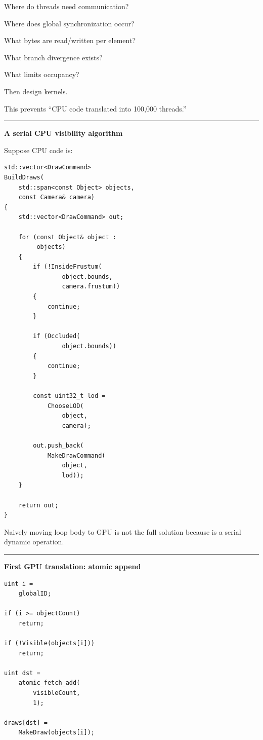 Where do threads need communication?

Where does global synchronization occur?

What bytes are read/written per element?

What branch divergence exists?

What limits occupancy?

Then design kernels.

This prevents ``CPU code translated into 100,000 threads.''

\begin{center}\rule{0.5\linewidth}{0.5pt}\end{center}

\textbf{A serial CPU visibility algorithm}

Suppose CPU code is:

\protect{}\label{p10-serial-cull}%
\begin{verbatim}
std::vector<DrawCommand>
BuildDraws(
    std::span<const Object> objects,
    const Camera& camera)
{
    std::vector<DrawCommand> out;

    for (const Object& object :
         objects)
    {
        if (!InsideFrustum(
                object.bounds,
                camera.frustum))
        {
            continue;
        }

        if (Occluded(
                object.bounds))
        {
            continue;
        }

        const uint32_t lod =
            ChooseLOD(
                object,
                camera);

        out.push_back(
            MakeDrawCommand(
                object,
                lod));
    }

    return out;
}
\end{verbatim}

Naively moving loop body to GPU is not the full solution because  is a serial dynamic operation.

\begin{center}\rule{0.5\linewidth}{0.5pt}\end{center}

\textbf{First GPU translation: atomic append}

\protect{}\label{p10-atomic-cull}%
\begin{verbatim}
uint i =
    globalID;

if (i >= objectCount)
    return;

if (!Visible(objects[i]))
    return;

uint dst =
    atomic_fetch_add(
        visibleCount,
        1);

draws[dst] =
    MakeDraw(objects[i]);
\end{verbatim}

